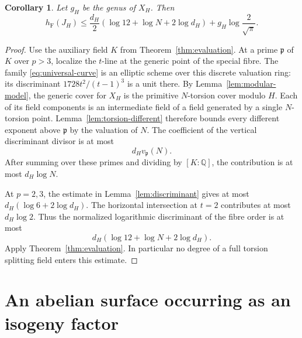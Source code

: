 \documentclass[11pt,a4paper]{article}
\newtheorem{corollary}[theorem]{Corollary}
\theoremstyle{definition}
\newcommand{\Q}{\mathbb Q}
\newcommand{\hF}{h_{\mathrm F}}
\begin{document}
\begin{corollary}\label{cor:modularheight}
Let $g_H$ be the genus of $X_H$. Then
\begin{equation}\label{eq:modularheight}
 \hF(J_H)\le
 \frac{d_H}{2}\left(\log12+\log N+2\log d_H\right)
                  +g_H\log\frac2{\sqrt\pi}.
\end{equation}
\end{corollary}
\begin{proof}
Use the auxiliary field $K$ from Theorem~\ref{thm:evaluation}.
At a prime $\mathfrak p$ of $K$ over $p>3$, localize the $t$-line
at the generic point of the special fibre. The family
\eqref{eq:universal-curve} is an elliptic scheme over this discrete
valuation ring: its discriminant $1728t^2/(t-1)^3$ is a unit there.
By Lemma~\ref{lem:modular-model}, the generic cover for $X_H$ is
the primitive $N$-torsion cover modulo $H$. Each of its field
components is an intermediate field of a field generated by a single
$N$-torsion point. Lemma~\ref{lem:torsion-different} therefore bounds
every different exponent above $\mathfrak p$ by the valuation of $N$.
The coefficient of the vertical discriminant divisor is at most
\[
                    d_H v_{\mathfrak p}(N).
\]
After summing over these primes and dividing by $[K:\Q]$, the
contribution is at most $d_H\log N$.

At $p=2,3$, the estimate in Lemma~\ref{lem:discriminant} gives at
most $d_H(\log6+2\log d_H)$. The horizontal intersection at
$t=2$ contributes at most $d_H\log2$. Thus the normalized
logarithmic discriminant of the fibre order is at most
\[
                 d_H(\log12+\log N+2\log d_H).
\]
Apply Theorem~\ref{thm:evaluation}. In particular no degree of a
full torsion splitting field enters this estimate.
\end{proof}

\section{An abelian surface occurring as an isogeny factor}
\end{document}
